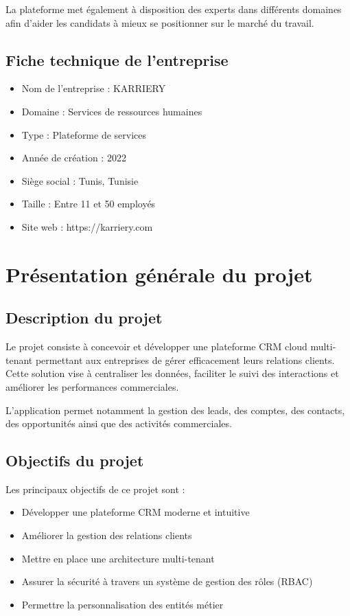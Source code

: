 \documentclass[12pt,a4paper]{report}
\begin{document}
La plateforme met également à disposition des experts dans différents domaines afin d’aider les candidats à mieux se positionner sur le marché du travail.

\subsection{Fiche technique de l’entreprise}

\begin{itemize}
\item Nom de l’entreprise : KARRIERY
\item Domaine : Services de ressources humaines
\item Type : Plateforme de services
\item Année de création : 2022
\item Siège social : Tunis, Tunisie
\item Taille : Entre 11 et 50 employés
\item Site web : https://karriery.com
\end{itemize}

\section{Présentation générale du projet}

\subsection{Description du projet}

Le projet consiste à concevoir et développer une plateforme CRM cloud multi-tenant permettant aux entreprises de gérer efficacement leurs relations clients. Cette solution vise à centraliser les données, faciliter le suivi des interactions et améliorer les performances commerciales.

L’application permet notamment la gestion des leads, des comptes, des contacts, des opportunités ainsi que des activités commerciales.

\subsection{Objectifs du projet}

Les principaux objectifs de ce projet sont :

\begin{itemize}
\item Développer une plateforme CRM moderne et intuitive
\item Améliorer la gestion des relations clients
\item Mettre en place une architecture multi-tenant
\item Assurer la sécurité à travers un système de gestion des rôles (RBAC)
\item Permettre la personnalisation des entités métier
\end{itemize}
\end{document}

